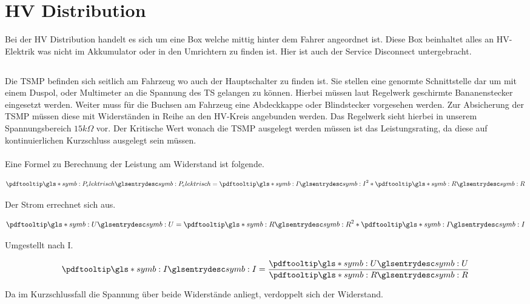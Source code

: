 \FloatBarrier
\section{HV Distribution}
Bei der HV Distribution handelt es sich um eine Box welche mittig hinter dem Fahrer angeordnet ist. Diese Box beinhaltet alles an \ac{HV}-Elektrik was nicht im Akkumulator oder in den Umrichtern zu finden ist. Hier ist auch der Service Disconnect untergebracht.

\FloatBarrier
\subsection{}
Die \ac{TSMP} befinden sich seitlich am Fahrzeug wo auch der Hauptschalter zu finden ist. Sie stellen eine genormte Schnittstelle dar um mit einem Duspol, oder Multimeter an die Spannung des \ac{TS} gelangen zu können. Hierbei müssen laut Regelwerk \cite{FSRules} geschirmte Bananenstecker eingesetzt werden. Weiter muss für die Buchsen am Fahrzeug eine Abdeckkappe oder Blindstecker vorgesehen werden. Zur Absicherung der \ac{TSMP} müssen diese mit Widerständen in Reihe an den \ac{HV}-Kreis angebunden werden. Das Regelwerk sieht hierbei in unserem Spannungsbereich \ensuremath{15k\Omega} vor. Der Kritische Wert wonach die \ac{TSMP} ausgelegt werden müssen ist das Leistungsrating, da diese auf kontinuierlichen Kurzschluss ausgelegt sein müssen.
\\
\\
Eine Formel zu Berechnung der Leistung am Widerstand ist folgende.

\begin{equation}
	\label{eqn:Leistung am Wiederstand}
	\glsc{symb:P_elektrisch} = \glsc{symb:I}^{2} * \glsc{symb:R}
\end{equation}

Der Strom errechnet sich aus.

\begin{equation}
	\label{eqn:URI}
	\glsc{symb:U} = \glsc{symb:R}^{2} * \glsc{symb:I}
\end{equation}

Umgestellt nach I.

\begin{equation}
	\label{eqn:IUR}
	\glsc{symb:I} = \dfrac{\glsc{symb:U}} {\glsc{symb:R}}
\end{equation}

Da im Kurzschlussfall die Spannung über beide Widerstände anliegt, verdoppelt sich der Widerstand.

